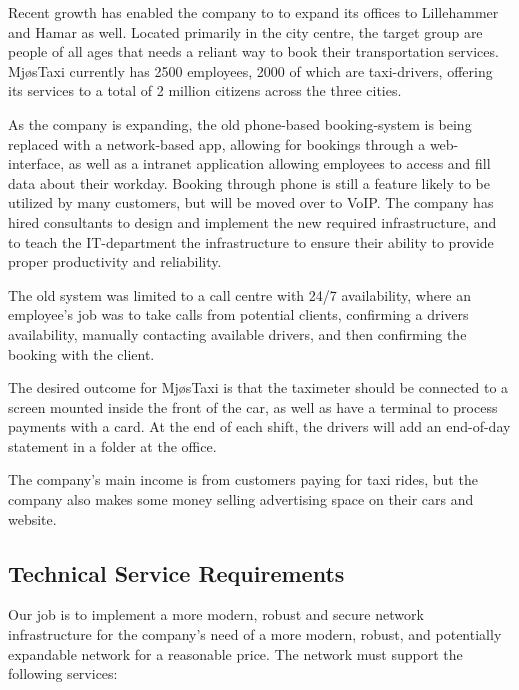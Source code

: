 Recent growth has enabled the company to to expand its offices to Lillehammer and Hamar as well. 
Located primarily in the city centre, the target group are people of all ages that needs a reliant way to book their transportation services.
MjøsTaxi currently has 2500 employees, 2000 of which are taxi-drivers, offering its services to a total of 2 million citizens across the three cities.

As the company is expanding, the old phone-based booking-system is being replaced with a network-based app, allowing for bookings through a web-interface, as well as a intranet application allowing employees to access and fill data about their workday. %
Booking through phone is still a feature likely to be utilized by many customers, but will be moved over to VoIP.
The company has hired consultants to design and implement the new required infrastructure, and to teach the IT-department the infrastructure to ensure their ability to provide proper productivity and reliability.

The old system was limited to a call centre with 24/7 availability, where an employee's job was to take calls from potential clients, confirming a drivers availability, manually contacting available drivers, and then confirming the booking with the client. 

The desired outcome for MjøsTaxi is that the taximeter should be connected to a screen mounted inside the front of the car, as well as have a terminal to process payments with a card. At the end of each shift, the drivers will add an end-of-day statement in a folder at the office. %


The company's main income is from customers paying for taxi rides, but the company also makes some money selling advertising space on their cars and website.


\subsection{Technical Service Requirements}
Our job is to implement a more modern, robust and secure network infrastructure for the company's need of a more modern, robust, and potentially expandable network for a reasonable price. 
The network must support the following services:

